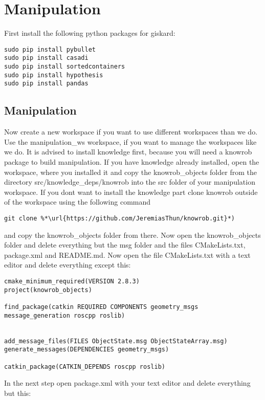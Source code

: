 \documentclass[main.tex]{subfiles}
\begin{document}
\section{Manipulation}
\label{sec:Manipulation}

First install the following python packages for giskard:

\begin{lstlisting}
sudo pip install pybullet
sudo pip install casadi
sudo pip install sortedcontainers
sudo pip install hypothesis
sudo pip install pandas
\end{lstlisting}
	
	\subsection{Manipulation}
Now create a new workspace if you want to use different workspaces than we do. Use the manipulation\_ws workspace, if you want to manage the workspaces like we do.
It is advised to install knowledge first, because you will need a knowrob package to build manipulation.
If you have knowledge already installed, open the workspace, where you installed it and copy the knowrob\_objects folder from the directory src/knowledge\_deps/knowrob into the src folder of your manipulation workspace. If you dont want to install the knowledge part clone knowrob outside of the workspace using the following command
\begin{lstlisting}
git clone %*\url{https://github.com/JeremiasThun/knowrob.git}*)
\end{lstlisting}
and copy the knowrob\_objects folder from there.
 Now open the knowrob\_objects folder and delete everything but  the msg folder and the files CMakeLists.txt, package.xml and README.md.
Now open the file CMakeLists.txt with a text editor and delete everything except this:
\begin{lstlisting}
cmake_minimum_required(VERSION 2.8.3)
project(knowrob_objects)

find_package(catkin REQUIRED COMPONENTS geometry_msgs message_generation roscpp roslib)


add_message_files(FILES ObjectState.msg ObjectStateArray.msg)
generate_messages(DEPENDENCIES geometry_msgs)

catkin_package(CATKIN_DEPENDS roscpp roslib)
\end{lstlisting}
In the next step open package.xml with your text editor and delete everything but this:
\end{document}
